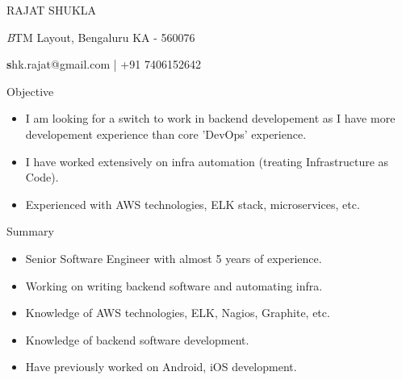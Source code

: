 \documentclass[a4paper,11pt,oneside]{article}
\makeatletter
\newcommand{\name}{RAJAT SHUKLA}
\newcommand{\addr}{BTM Layout, Bengaluru KA - 560076}
\newcommand{\contact}{shk.rajat@gmail.com | +91 7406152642}
\newcommand{\bigname}[1]{
  \begin{center}\fontfamily{phv}\selectfont\LARGE#1\end{center}
}
\newcommand{\bignamenew}[1]{
  \begin{center}\selectfont\Huge#1\end{center}
}
\newcommand{\addrinfo}[1]{
  \begin{center}\selectfont\small\textit#1\end{center}
}
\newcommand{\contactinfo}[1]{
  \begin{center}\selectfont\small\textbf#1\end{center}
}
\newenvironment{ressection}[1]{
  \vspace{4pt}
         {\fontfamily{phv}\selectfont\Large#1}
         \begin{itemize}
           \vspace{3pt}
}{
         \end{itemize}
}
\newcommand{\resitem}[1]{
  \vspace{-4pt}
\item \begin{flushleft} #1 \end{flushleft}
}
\newcommand{\ressubitem}[1]{
  \vspace{-1pt}
\item \begin{flushleft} #1 \end{flushleft}
}
\newcommand{\resbigitem}[3]{
  \vspace{-5pt}
\item
  \textbf{#1} --- #2 \\
  \textit{#3}
}
\newenvironment{ressubsec}[3]{
  \resbigitem{#1}{#2}{#3}
  \vspace{-2pt}
  \begin{itemize}
}{
  \end{itemize}
}
\makeatother
\begin{document}

\bigname{\name}

\vspace{2 pt}
\addrinfo{\addr}

\contactinfo{\contact}
\vspace{8 pt}


\begin{ressection}{Objective}
  \resitem{
    I am looking for a switch to work in backend developement as
    I have more developement experience than core 'DevOps' experience.
  }
  \resitem{
    I have worked extensively on infra automation (treating
    Infrastructure as Code).
  }
  \resitem{
    Experienced with AWS technologies, ELK stack, microservices, etc.
  }
\end{ressection}


\begin{ressection}{Summary}
  \resitem{
    Senior Software Engineer with almost 5 years of experience.
  }
  \resitem{
    Working on writing backend software and automating infra.
  }
  \resitem{
    Knowledge of AWS technologies, ELK, Nagios, Graphite, etc.
  }
  \resitem{
    Knowledge of backend software development.
  }
  \resitem{
    Have previously worked on Android, iOS development.
  }
\end{ressection}




\end{document}
